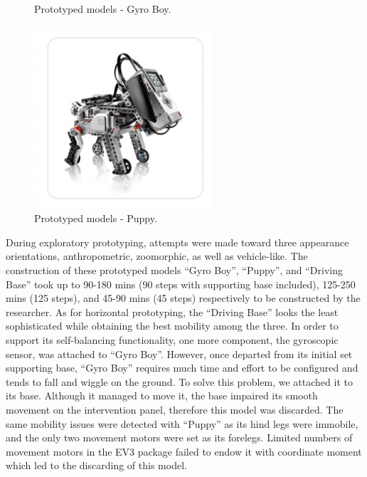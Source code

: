 \documentclass[english]{textolivre}
\begin{document}
\begin{figure}[h!]
\begin{minipage}[t]{0.30\textwidth}
 \caption{Prototyped models - Gyro Boy.}
 \label{fig32}
 \end{minipage}%
  \qquad
 \begin{minipage}[t]{0.30\textwidth}
 \includegraphics[width=\textwidth]{Fig33.png}
 \caption{Prototyped models - Puppy.}
 \label{fig33}
 \end{minipage}%
\end{figure}

During exploratory prototyping, attempts were made toward three appearance orientations, anthropometric, zoomorphic, as well as vehicle-like. The construction of these prototyped models “Gyro Boy”, “Puppy”, and “Driving Base” took up to 90-180 mins (90 steps with supporting base included), 125-250 mins (125 steps), and 45-90 mins (45 steps) respectively to be constructed by the researcher. As for horizontal prototyping, the “Driving Base” looks the least sophisticated while obtaining the best mobility among the three. In order to support its self-balancing functionality, one more component, the gyroscopic sensor, was attached to “Gyro Boy”. However, once departed from its initial set supporting base, “Gyro Boy” requires much time and effort to be configured and tends to fall and wiggle on the ground. To solve this problem, we attached it to its base. Although it managed to move it, the base impaired its smooth movement on the intervention panel, therefore this model was discarded. The same mobility issues were detected with “Puppy” as its hind legs were immobile, and the only two movement motors were set as its forelegs. Limited numbers of movement motors in the EV3 package failed to endow it with coordinate moment which led to the discarding of this model.
\end{document}
